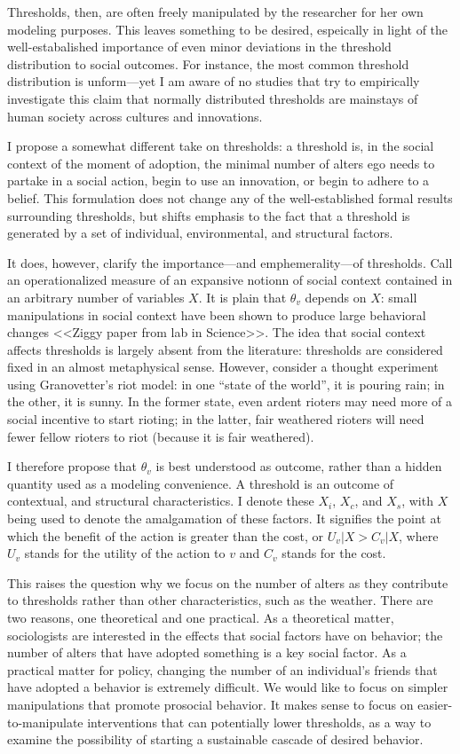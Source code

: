 \documentclass{article}
\begin{document}
Thresholds, then, are often freely manipulated by the researcher for her own modeling purposes. This leaves something to be desired, espeically in light of the well-estabalished importance of even minor deviations in the threshold distribution to social outcomes. For instance, the most common threshold distribution is unform---yet I am aware of no studies that try to empirically investigate this claim that normally distributed thresholds are mainstays of human society across cultures and innovations.

I propose a somewhat different take on thresholds: a threshold is, in the social context of the moment of adoption, the minimal number of alters ego needs to partake in a social action, begin to use an innovation, or begin to adhere to a belief. This formulation does not change any of the well-established formal results surrounding thresholds, but shifts emphasis to the fact that a threshold is generated by a set of individual, environmental, and structural factors. 

It does, however, clarify the importance---and emphemerality---of thresholds. Call an operationalized measure of an expansive notionn of social context contained in an arbitrary number of variables $X$. It is plain that $\theta_v$ depends on $X$: small manipulations in social context have been shown to produce large behavioral changes <<Ziggy paper from lab in Science>>. The idea that social context affects thresholds is largely absent from the literature: thresholds are considered fixed in an almost metaphysical sense. However, consider a thought experiment using Granovetter's riot model: in one ``state of the world'', it is pouring rain; in the other, it is sunny. In the former state, even ardent rioters may need more of a social incentive to start rioting; in the latter, fair weathered rioters will need fewer fellow rioters to riot (because it is fair weathered).

I therefore propose that $\theta_v$ is best understood as outcome, rather than a hidden quantity used as a modeling convenience. A threshold is an outcome of contextual, and structural characteristics. I denote these $X_i$, $X_c$, and $X_s$, with $X$ being used to denote the amalgamation of these factors. It signifies the point at which the benefit of the action is greater than the cost, or $U_v|X > C_v|X$, where $U_v$ stands for the utility of the action to $v$ and $C_v$ stands for the cost.

This raises the question why we focus on the number of alters as they contribute to thresholds rather than other characteristics, such as the weather. There are two reasons, one theoretical and one practical. As a theoretical matter, sociologists are interested in the effects that social factors have on behavior; the number of alters that have adopted something is a key social factor. As a practical matter for policy, changing the number of an individual's friends that have adopted a behavior is extremely difficult. We would like to focus on simpler manipulations that promote prosocial behavior. It makes sense to focus on easier-to-manipulate interventions that can potentially lower thresholds, as a way to examine the possibility of starting a sustainable cascade of desired behavior. 
\end{document}
